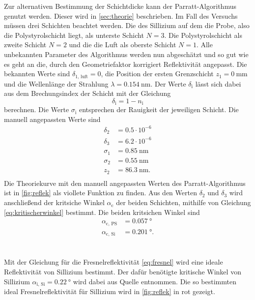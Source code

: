 Zur alternativen Bestimmung der Schichtdicke kann der Parratt-Algorithmus genutzt werden.
Dieser wird in \autoref{sec:theorie} beschrieben.
Im Fall des Versuchs müssen drei Schichten beachtet werden.
Die des Sillizium auf dem die Probe, also die Polystyrolschicht liegt, als unterste Schicht $N=3$.
Die Polystyrolschicht als zweite Schicht $N=2$ und die die Luft als oberste Schicht $N=1$.
Alle unbekannten Parameter des Algorithmus werden nun abgeschätzt und so gut wie es geht an die, durch den Geometriefaktor korrigiert Reflektivität angepasst.
Die bekannten Werte sind $\delta_\text{1, luft} = 0$, die Position der ersten Grenzschicht $z_1= \SI{0}{\milli\meter}$ und die Wellenlänge der Strahlung $\lambda =\SI{0.154}{\nano\meter}$.
Der Werte $\delta_\text{i}$ lässt sich dabei aus dem Brechungsindex der Schicht mit der Gleichung
\begin{equation}
    \delta_\text{i} = 1- n_\text{i}
\end{equation}
berechnen.
Die Werte $\sigma_\text{i}$ entsprechen der Rauigkeit der jeweiligen Schicht.
Die manuell angepassten Werte sind
\begin{align*}
    \delta_2 &= 0.5\cdot10^{-6}        \\ 
    \delta_3 &= 6.2\cdot10^{-6}        \\ 
    \sigma_1 &= \SI{0.85}{\nano\meter} \\ 
    \sigma_2 &= \SI{0.55}{\nano\meter} \\ 
    z_2 &= \SI{86.3}{\nano\meter}.  \\
\end{align*}
Die Theoriekurve mit den manuell angepassten Werten des Parratt-Algorithmus ist in \autoref{fig:reflek} als viollete Funktion zu finden.
Aus den Werten $\delta_2$ und $\delta_3$ wird anschließend der kritsiche Winkel $\alpha_\text{c}$ der beiden Schichten, mithilfe von Gleichung \eqref{eq:kritischerwinkel} bestimmt.
Die beiden kritsichen Winkel sind 
\begin{align*}
    \alpha_\text{c, PS} &= \SI{0.057}{\degree}\\
    \alpha_\text{c, Si} &= \SI{0.201}{\degree}.
\end{align*}
\\\\
Mit der Gleichung für die Fresnelreflektivität \eqref{eq:fresnel} wird eine ideale Reflektivität von Sillizium bestimmt.
Der dafür benötigte kritische Winkel von Sillizium $\alpha_\text{i, Si} = \SI{0.22}{\degree}$ wird dabei aus Quelle \cite[8]{alte_anleitung} entnommen.
Die so bestimmten ideal Fresnelreflektivität für Sillizium wird in \autoref{fig:reflek} in rot gezeigt.
